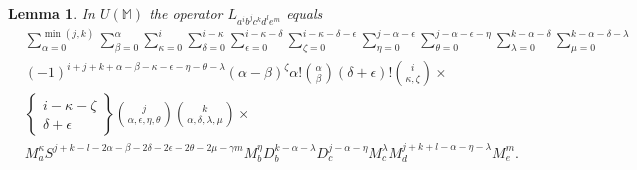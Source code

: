 \documentclass{amsart}
\theoremstyle{plain}
\newtheorem{lemma}{Lemma}[section]
\theoremstyle{definition}
\begin{document}
\begin{lemma}
In $U(\mathbb{M})$ the operator $L_{a^i b^j c^k d^l e^m}$ equals
  \allowdisplaybreaks
  \begin{align*}
  &
  \sum_{\alpha=0}^{\min(j,k)}
  \sum_{\beta=0}^{\alpha}
  \sum_{\kappa=0}^{i}
  \sum_{\delta=0}^{i-\kappa}
  \sum_{\epsilon=0}^{i-\kappa-\delta}
  \sum_{\zeta=0}^{i{-}\kappa{-}\delta{-}\epsilon}
  \sum_{\eta=0}^{j-\alpha-\epsilon}
  \sum_{\theta=0}^{j-\alpha-\epsilon-\eta}
  \sum_{\lambda=0}^{k-\alpha-\delta}
  \sum_{\mu=0}^{k-\alpha-\delta-\lambda}
  \\
  &
  (-1)^{i+j+k+\alpha-\beta-\kappa-\epsilon-\eta-\theta-\lambda}
  (\alpha{-}\beta)^\zeta
  \alpha!
  \binom{\alpha}{\beta}
  (\delta{+}\epsilon)!
  \binom{i}{\kappa,\zeta}
  \times
  \\
  &
  \left\{ \begin{matrix}
  i{-}\kappa{-}\zeta \\ \delta{+}\epsilon
  \end{matrix} \right\}
  \binom{j}{\alpha,\epsilon,\eta,\theta}
  \binom{k}{\alpha,\delta,\lambda,\mu}
  \times
  \\
  &
  M_a^{\kappa}
  S^{j+k-l-2\alpha-\beta-2\delta-2\epsilon-2\theta-2\mu-\gamma m}
  M_b^{\eta} D_b^{k-\alpha-\lambda} D_c^{j-\alpha-\eta}
  M_c^{\lambda} M_d^{j+k+l-\alpha-\eta-\lambda} M_e^m.
  \end{align*}
\end{lemma}
\end{document}
